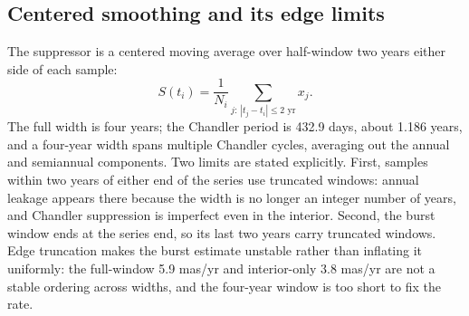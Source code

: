 \documentclass[11pt,a4paper]{article}
\begin{document}
\begin{table}[ht]
\centering
\caption{Method contrast on the IERS finals October 2022--November 2026 window. The whole-record co-fit is context; the raw and sequential rows show wobble inflation; the smoothed row is an unstable centered-width value, with its edge variant.}
\label{tab:contrast}
\small
{}
\end{table}

\subsection{Centered smoothing and its edge limits}

The suppressor is a centered moving average over half-window two years either side of each sample:
\begin{equation}
S(t_i) = \frac{1}{N_i} \sum_{j:\,|t_j - t_i| \le 2\text{ yr}} x_j .
\end{equation}
The full width is four years; the Chandler period is 432.9 days, about 1.186 years, and a four-year width spans multiple Chandler cycles, averaging out the annual and semiannual components. Two limits are stated explicitly. First, samples within two years of either end of the series use truncated windows: annual leakage appears there because the width is no longer an integer number of years, and Chandler suppression is imperfect even in the interior. Second, the burst window ends at the series end, so its last two years carry truncated windows. Edge truncation makes the burst estimate unstable rather than inflating it uniformly: the full-window 5.9 mas/yr and interior-only 3.8 mas/yr are not a stable ordering across widths, and the four-year window is too short to fix the rate.
\end{document}
